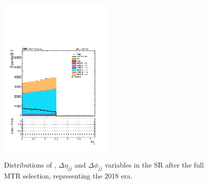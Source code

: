 \begin{figure}[htbp]
{    \includegraphics[width=0.49\textwidth]{Analysis_strategy/MTR_2018_SR/leading_dPhijj.pdf}
    }
  \caption{Distributions of \mindphi, $\Delta\eta_{jj}$ and $\Delta\phi_{jj}$ variables in the SR after the full MTR selection, representing the 2018 era.}
  \label{fig:2018_SR_motivation_1}
\end{figure}
